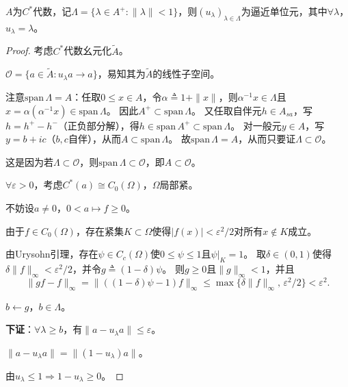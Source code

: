 \documentclass[lang=cn,a4paper,newtx,section]{elegantbook}
\begin{document}
  \begin{theorem}
    $A$为$C^*$代数，记$\Lambda = \{\lambda \in A^+ : \|\lambda\| < 1\}$，则$(u_\lambda)_{\lambda \in \Lambda}$为逼近单位元，其中$\forall \lambda$，$u_\lambda = \lambda$。
  \end{theorem}
  
  \begin{proof}
    考虑$C^*$代数幺元化$\tilde{A}$。
    
    $\mathcal{O} = \{a \in \tilde{A} : u_\lambda a \to a\}$，易知其为$\tilde{A}$的线性子空间。
    
    注意$\mathrm{span}\,\Lambda = A$：任取$0 \leq x \in A$，令$\alpha \triangleq 1 + \|x\|$，则$\alpha^{-1}x \in \Lambda$且$x = \alpha(\alpha^{-1}x) \in \mathrm{span}\,\Lambda$。
    因此$A^+ \subset \mathrm{span}\,\Lambda$。
    又任取自伴元$h \in A_{sa}$，写$h = h^+ - h^-$（正负部分解），得$h \in \mathrm{span}\,A^+ \subset \mathrm{span}\,\Lambda$。
    对一般元$y \in A$，写$y = b + ic$（$b, c$自伴），从而$A \subset \mathrm{span}\,\Lambda$。
    故$\mathrm{span}\,\Lambda = A$，从而只要证$\Lambda \subset \mathcal{O}$。
    
    这是因为若$\Lambda \subset \mathcal{O}$，则$\mathrm{span}\,\Lambda \subset \mathcal{O}$，即$A \subset \mathcal{O}$。
    
    $\forall \varepsilon > 0$，考虑$C^*(a) \cong C_0(\Omega)$，$\Omega$局部紧。
    
    不妨设$a \neq 0$，$0 < a \mapsto f \geq 0$。
    
    由于$f \in C_0(\Omega)$，存在紧集$K \subset \Omega$使得$|f(x)| < \varepsilon^2/2$对所有$x \notin K$成立。
    
    由Urysohn引理，存在$\psi \in C_c(\Omega)$使$0 \leq \psi \leq 1$且$\psi|_K = 1$。
    取$\delta \in (0, 1)$使得$\delta\|f\|_{\infty} < \varepsilon^2/2$，并令$g \triangleq (1 - \delta)\psi$。
    则$g \geq 0$且$\|g\|_{\infty} < 1$，并且
    \begin{equation*}
      \|gf - f\|_{\infty} = \|((1-\delta)\psi - 1)f\|_{\infty} \leq \max\{\delta\|f\|_{\infty},\, \varepsilon^2/2\} < \varepsilon^2.
    \end{equation*}
    
    $b \leftarrow g$，$b \in \Lambda$。
    
    \textbf{下证}：$\forall \lambda \geq b$，有$\|a - u_\lambda a\| \leq \varepsilon$。
    
    $\|a - u_\lambda a\| = \|(1 - u_\lambda)a\|$。
    
    由$u_\lambda \leq 1 \Rightarrow 1 - u_\lambda \geq 0$。
    

\end{proof}
\end{document}
